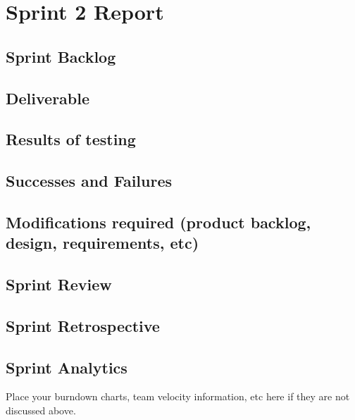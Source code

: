
\section{Sprint 2 Report}
\subsection{Sprint Backlog}
\subsection{Deliverable}
\subsection{Results of testing}
\subsection{Successes and Failures}
\subsection{Modifications required (product backlog, design, requirements, etc)}
\subsection{Sprint Review}
\subsection{Sprint Retrospective}
\subsection{Sprint Analytics} 
Place your burndown charts, team velocity information, etc here if they are not discussed above.